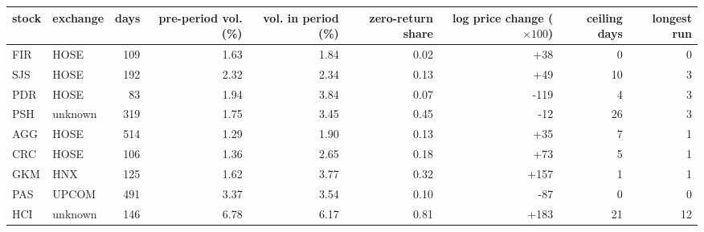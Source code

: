 \begin{tabular}{llrrrrrrr}
\toprule
stock & exchange & days & pre-period vol. (\%) & vol. in period (\%) & zero-return share & log price change ($\times100$) & ceiling days & longest run \\
\midrule
FIR & HOSE & 109 & 1.63 & 1.84 & 0.02 & +38 & 0 & 0 \\
SJS & HOSE & 192 & 2.32 & 2.34 & 0.13 & +49 & 10 & 3 \\
PDR & HOSE & 83 & 1.94 & 3.84 & 0.07 & -119 & 4 & 3 \\
PSH & unknown & 319 & 1.75 & 3.45 & 0.45 & -12 & 26 & 3 \\
AGG & HOSE & 514 & 1.29 & 1.90 & 0.13 & +35 & 7 & 1 \\
CRC & HOSE & 106 & 1.36 & 2.65 & 0.18 & +73 & 5 & 1 \\
GKM & HNX & 125 & 1.62 & 3.77 & 0.32 & +157 & 1 & 1 \\
PAS & UPCOM & 491 & 3.37 & 3.54 & 0.10 & -87 & 0 & 0 \\
HCI & unknown & 146 & 6.78 & 6.17 & 0.81 & +183 & 21 & 12 \\
\bottomrule
\end{tabular}
